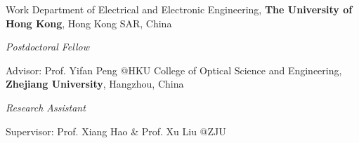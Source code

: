 \begin{rubric}{Work}
	\entry*[2024/04 -- Present]%
	Department of Electrical and Electronic Engineering, \textbf{The University of Hong Kong}, Hong Kong SAR, China
	\par \textit{Postdoctoral Fellow}
	\par Advisor: Prof. Yifan Peng @HKU
    \entry*[2024/01 -- 2024/03]%
	College of Optical Science and Engineering, \textbf{Zhejiang University}, Hangzhou, China
	\par \textit{Research Assistant}
	\par Supervisor: Prof. Xiang Hao \& Prof. Xu Liu @ZJU
\end{rubric}
